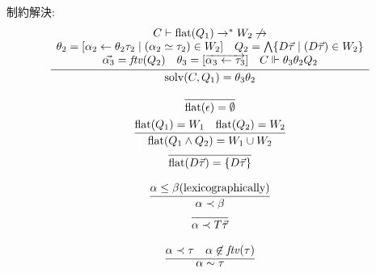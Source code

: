 制約解決:
\begin{gather*}
  \infer{
    \mathrm{solv}(C, Q_1) = \theta_3 \theta_2
  }{
    \begin{array}{c}
      C \vdash \mathrm{flat}(Q_1) \to^* W_2 \mathrel{\not\to} \\
      \theta_2 = [\alpha_2 \assign \theta_2\tau_2 \mid (\alpha_2 \simeq \tau_2) \in W_2]
      \hspace{1em}
      Q_2 = \bigwedge \{D \vec{\tau} \mid (D \vec{\tau}) \in W_2\}
      \\
      \vec{\alpha_3} = \mathit{ftv}(Q_2)
      \hspace{1em}
      \theta_3 = [\overrightarrow{\alpha_3 \assign \tau_3}]
      \hspace{1em}
      C \Vdash \theta_3 \theta_2 Q_2
    \end{array}
  }
\end{gather*}

\begin{gather*}
  \infer{
    \mathrm{flat}(\epsilon) = \emptyset
  }{}
  \\
  \infer{
    \mathrm{flat}(Q_1 \land Q_2) = W_1 \cup W_2
  }{
    \mathrm{flat}(Q_1) = W_1
    &
    \mathrm{flat}(Q_2) = W_2
  }
  \\
  \infer{
    \mathrm{flat}(D \vec{\tau}) = \{D \vec{\tau}\}
  }{}
\end{gather*}

\begin{gather*}
  \infer{
    \alpha \prec \beta
  }{
    \alpha \leq \beta (\text{lexicographically})
  }
  \\
  \infer{
    \alpha \prec T \vec{\tau}
  }{}
\end{gather*}

\begin{gather*}
  \infer{
    \alpha \sim \tau
  }{
    \alpha \prec \tau
    &
    \alpha \not\in \mathit{ftv}(\tau)
  }
\end{gather*}

